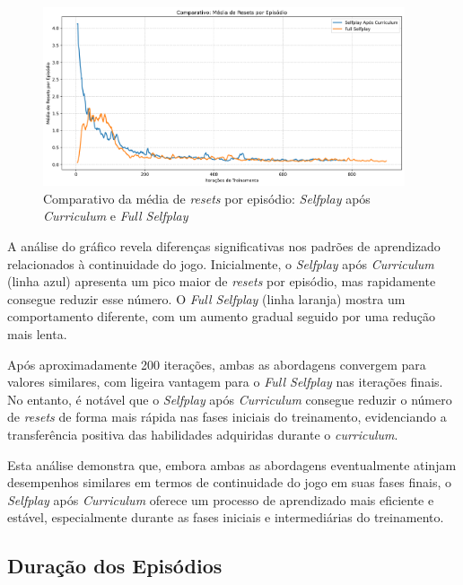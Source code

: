 \begin{figure}[H]
    \centering
    \includegraphics[width=0.95\textwidth]{fig/graficos_trabalho/graficos_experimentos/geral/comparativo_resets_por_episodio.png}
    \caption{Comparativo da média de \textit{resets} por episódio: \textit{Selfplay} após \textit{Curriculum} e \textit{Full Selfplay}}
    \label{fig:total_resets}
\end{figure}

A análise do gráfico revela diferenças significativas nos padrões de aprendizado relacionados à continuidade do jogo. Inicialmente, o \textit{Selfplay} após \textit{Curriculum} (linha azul) apresenta um pico maior de \textit{resets} por episódio, mas rapidamente consegue reduzir esse número. O \textit{Full Selfplay} (linha laranja) mostra um comportamento diferente, com um aumento gradual seguido por uma redução mais lenta.

Após aproximadamente 200 iterações, ambas as abordagens convergem para valores similares, com ligeira vantagem para o \textit{Full Selfplay} nas iterações finais. No entanto, é notável que o \textit{Selfplay} após \textit{Curriculum} consegue reduzir o número de \textit{resets} de forma mais rápida nas fases iniciais do treinamento, evidenciando a transferência positiva das habilidades adquiridas durante o \textit{curriculum}.

Esta análise demonstra que, embora ambas as abordagens eventualmente atinjam desempenhos similares em termos de continuidade do jogo em suas fases finais, o \textit{Selfplay} após \textit{Curriculum} oferece um processo de aprendizado mais eficiente e estável, especialmente durante as fases iniciais e intermediárias do treinamento.

\subsection{Duração dos Episódios}

